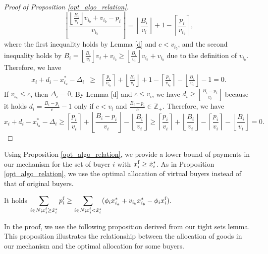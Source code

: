 \documentclass[letterpaper,11pt]{article}
\begin{document}
\begin{proof}[Proof of Proposition \ref{opt_algo_relation}]
\[	\left\lfloor \frac{\left\lfloor \frac{B_i}{v_i}\right\rfloor v_{i_b}+v_{i_{b}}-p_i}{v_{i_{b}}}\right\rfloor
	=\left\lfloor \frac{B_i}{v_i}\right\rfloor +1-\left\lceil\frac{p_i}{v_{i_{b}}}\right\rceil, 
	\]
	where the first inequality holds by Lemma \ref{d} and $c< v_{i_{b}}$, 
	and the second inequality holds by $B_i=\left\lfloor \frac{B_i}{v_i}\right\rfloor v_i+v_{i_{b}}\geq 
	\left\lfloor \frac{B_i}{v_i}\right\rfloor v_{i_b}+v_{i_{b}}$ due to the definition of $v_{i_b}$.
	Therefore, we have
	\begin{eqnarray*}
	x_i+d_i-x^*_{i_{a}}-\Delta_i&\geq& %
	\left\lceil\frac{p_i}{v_{i_{b}}}\right\rceil+ \left\lfloor \frac{B_i}{v_i}\right\rfloor+1-\left\lceil\frac{p_i}{v_{i_{b}}}\right\rceil- \left\lfloor \frac{B_i}{v_i}\right\rfloor-1=0.
	\end{eqnarray*}
	If $v_{i_{b}}\leq c$, then $\Delta_i=0$. By Lemma \ref{d} and $c\leq v_i$, we have 
	$d_i\geq\left\lfloor \frac{B_i-p_i}{v_i}\right\rfloor$ because 
	it holds $d_i=\frac{B_i-p_i}{c}-1$ only if $c<v_i$ and $\frac{B_i-p_i}{c}\in \mathbb Z_{+}$. 
	Therefore, we have 
	\[
	x_i+d_i-x^*_{i_{a}}-\Delta_i\geq \left\lceil \frac{p_i}{v_i}\right\rceil+\left\lfloor \frac{B_i-p_i}{v_i}\right\rfloor- \left\lfloor \frac{B_i}{v_i}\right\rfloor\geq \left\lceil \frac{p_i}{v_i}\right\rceil+\left\lfloor \frac{B_i}{v_i}\right\rfloor-\left\lceil \frac{p_i}{v_i}\right\rceil- \left\lfloor \frac{B_i}{v_i}\right\rfloor=0.
	\]
	\end{proof}
	
	Using Proposition \ref{opt_algo_relation}, 
	we provide a lower bound of payments in our mechanism for the set of buyer $i$ 
	with $x^{\rm f}_i\geq \tilde{x}^*_i$.
	As in Proposition \ref{opt_algo_relation}, 
	we use the optimal allocation of virtual buyers instead of 
	that of original buyers.
	
	
	\begin{theorem}
	\label{payment}
	It holds
	$\displaystyle \sum_{i\in N; x^{\rm f}_i\geq \tilde{x}^*_i}p^{\rm f}_i\geq \sum_{i\in N; x^{\rm f}_i< \tilde{x}^*_i}
	(\phi_{i}x_{i_{a}}^*+v_{i_{b}}x_{i_{b}}^*-\phi_{i}x^{\rm f}_{i}).$
	\end{theorem}

	In the proof, we use the following proposition derived from our tight sets lemma. 
	This proposition illustrates the relationship between the allocation of goods in our mechanism and 
	the optimal allocation for some buyers.
\end{document}
